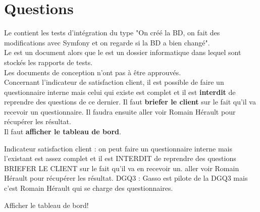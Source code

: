 \documentclass [a4paper] {article}
\begin{document}
\section{Questions}

Le \PTI{} contient les tests d'intégration du type "On créé la BD, on fait des modifications avec Symfony et on regarde si la BD a bien changé".\\

Le \DTU{} est un document alors que le \PTU{} est un dossier informatique dans lequel sont stockés les rapports de tests. \\

Les documents de conception n'ont pas à être approuvés.\\

Concernant l'indicateur de satisfaction client, il est possible de faire un questionnaire interne mais celui qui existe est complet et il est \textbf{interdit} de reprendre des questions de ce dernier. Il faut \textbf{briefer le client} sur le fait qu'il va recevoir un questionnaire. Il faudra ensuite aller voir Romain Hérault pour récupérer les résultat.\\

Il faut \textbf{afficher le tableau de bord}.


Indicateur satisfaction client : on peut faire un questionnaire interne mais l'existant est assez complet et il est INTERDIT de reprendre des questions 	BRIEFER LE CLIENT sur le fait qu'il va en recevoir un. aller voir Romain Hérault pour récupérer les résultat.
DGQ3 : Gasso est pilote de la DGQ3 mais c'est Romain Hérault qui se charge des questionnaires.

Afficher le tableau de bord! 
\end{document}
